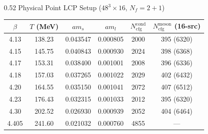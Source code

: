 \documentclass[10pt, aspectratio=169]{beamer} %
\begin{document}
\begin{frame}
\vfill

\begin{columns}[T]
    \begin{column}{0.52\textwidth}
        \setlength{\leftskip}{0pt}
        \centering
        {\footnotesize Physical Point LCP Setup ($48^3 \times 16$, $N_f = 2+1$)} \\
        \vspace{0.2em}
        \tiny
        \renewcommand{\arraystretch}{1.1}
        \setlength{\tabcolsep}{2.8pt}
        \begin{tabular}{cccccc}
            \toprule
            $\beta$ & $T$ (MeV) & $am_s$ & $am_l$ & $N_{\mathrm{cfg}}^{\mathrm{cond}}$ & $N_{\mathrm{cfg}}^{\mathrm{meson}}$ (16-src) \\
            \midrule
            4.13  & 138.23 & 0.043547 & 0.000805 & 2000 & 395 (6320) \\
            4.15  & 145.75 & 0.040843 & 0.000930 & 2024 & 398 (6368) \\
            4.17  & 153.31 & 0.038400 & 0.001001 & 2008 & 396 (6336) \\
            4.18  & 157.03 & 0.037265 & 0.001022 & 2029 & 402 (6432) \\
            4.20  & 164.55 & 0.035150 & 0.001041 & 2072 & 407 (6512) \\
            4.23  & 176.43 & 0.032315 & 0.001033 & 2012 & 395 (6320) \\
            4.30  & 202.52 & 0.026930 & 0.000939 & 2052 & 404 (6464) \\
            4.405 & 241.60 & 0.021032 & 0.000760 & 4855 & --- \\
            \bottomrule
        \end{tabular}
    \end{column}


\end{columns}
\end{frame}
\end{document}
